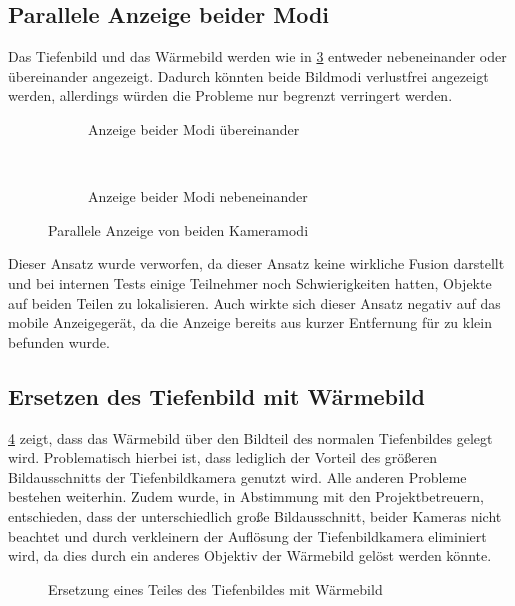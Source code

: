 \subsection{Parallele Anzeige beider Modi}
Das Tiefenbild und das Wärmebild werden wie in \cref{fig:fusion_both} entweder nebeneinander oder übereinander angezeigt.
Dadurch könnten beide Bildmodi verlustfrei angezeigt werden, allerdings würden die Probleme nur begrenzt verringert werden.
\begin{figure}[H]
	\centering
	\begin{subfigure}[t]{0.25\textwidth}
		\centering
		\caption{Anzeige beider Modi übereinander}
		\label{fig:fusion_both_over}
	\end{subfigure}
	~
	\begin{subfigure}[t]{0.65\textwidth}
		\centering
		\caption{Anzeige beider Modi nebeneinander}
		\label{fig:fusion_both_besides}
	\end{subfigure}
	\caption{Parallele Anzeige von beiden Kameramodi}
	\label{fig:fusion_both}
\end{figure}

Dieser Ansatz wurde verworfen, da dieser Ansatz keine wirkliche Fusion darstellt und bei internen Tests einige Teilnehmer noch Schwierigkeiten hatten, Objekte auf beiden Teilen zu lokalisieren.
Auch wirkte sich dieser Ansatz negativ auf das mobile Anzeigegerät, da die Anzeige bereits aus kurzer Entfernung für zu klein befunden wurde.

\subsection{Ersetzen des Tiefenbild mit Wärmebild}
\label{sec:fusion_overwrite}
\cref{fig:fusion_overwrite} zeigt, dass das Wärmebild über den Bildteil des normalen Tiefenbildes gelegt wird.
Problematisch hierbei ist, dass lediglich der Vorteil des größeren Bildausschnitts der Tiefenbildkamera genutzt wird.
Alle anderen Probleme bestehen weiterhin.
Zudem wurde, in Abstimmung mit den Projektbetreuern, entschieden, dass der unterschiedlich große Bildausschnitt, beider Kameras nicht beachtet und durch verkleinern der Auflösung der Tiefenbildkamera eliminiert wird, da dies durch ein anderes Objektiv der Wärmebild gelöst werden könnte.
\begin{figure}[H]
	\centering
	\caption{Ersetzung eines Teiles des Tiefenbildes mit Wärmebild}
	\label{fig:fusion_overwrite}
\end{figure}

